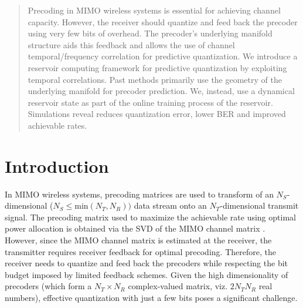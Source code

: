 \documentclass[conference]{IEEEtran}
\begin{document}
\begin{abstract}


  Precoding in MIMO wireless systems is essential for achieving
  channel capacity. However, the receiver should quantize and feed
  back the precoder using very few bits of overhead. The precoder's
  underlying manifold structure aids this feedback and allows the use
  of channel temporal/frequency correlation for predictive
  quantization. We introduce a reservoir computing framework for
  predictive quantization by exploiting temporal correlations. Past
  methods primarily use the geometry of the underlying manifold for
  precoder prediction.  We, instead, use a dynamical reservoir state
  as part of the online training process of the reservoir.
  Simulations reveal reduces quantization error, lower BER and
  improved achievable rates.
\end{abstract}


\vspace{-5pt}
\section{Introduction}
\label{intro}
In MIMO wireless systems, precoding matrices are used to transform of an $N_S$-dimensional ($N_S \leq \text{min}(N_T,N_R))$ data stream onto an $N_T$-dimensional transmit signal.
The precoding matrix used to maximize the achievable rate using optimal power allocation is obtained via the SVD of the MIMO channel matrix \cite{love2008overview}.
However, since the MIMO channel matrix is estimated at the receiver, the transmitter requires receiver feedback for optimal precoding.
Therefore, the receiver needs to quantize and feed back the precoders while respecting the bit budget imposed by limited feedback schemes.
Given the high dimensionality of precoders (which form a $N_T \times N_R$ complex-valued matrix, viz. $2N_TN_R$ real numbers), effective quantization with just a few bits poses a significant challenge.
\end{document}
